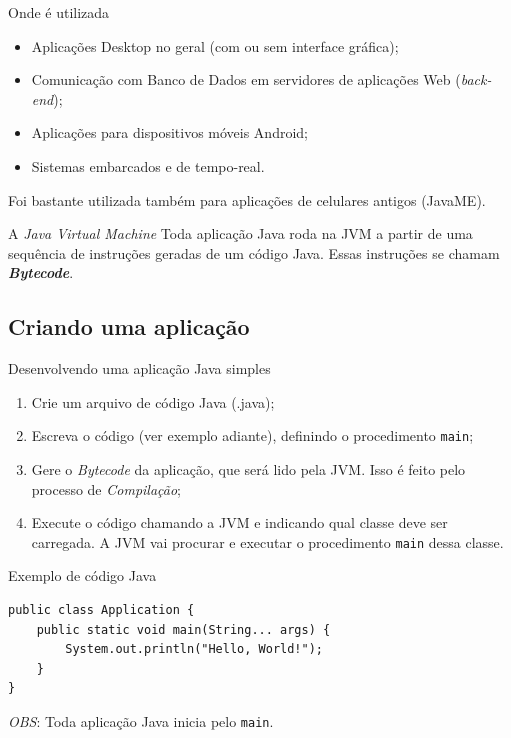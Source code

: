 \documentclass{beamer}
\begin{document}
\begin{frame}{Onde é utilizada}
    \begin{itemize}
        \item Aplicações Desktop no geral (com ou sem interface gráfica);
        \item Comunicação com Banco de Dados em servidores de aplicações Web
            (\textit{back-end});
        \item Aplicações para dispositivos móveis Android;
        \item Sistemas embarcados e de tempo-real.
    \end{itemize}

    Foi bastante utilizada também para aplicações de celulares antigos (JavaME).
\end{frame}


\begin{frame}{A \textit{Java Virtual Machine}}
    Toda aplicação Java roda na JVM a partir de uma sequência de instruções
    geradas de um código Java. Essas instruções se chamam
    \textbf{\textit{Bytecode}}.
\end{frame}


\subsection{Criando uma aplicação}

\begin{frame}{Desenvolvendo uma aplicação Java simples}
    \begin{enumerate}
        \item Crie um arquivo de código Java (.java);
        \item Escreva o código (ver exemplo adiante), definindo o procedimento
            \texttt{main};
        \item Gere o \textit{Bytecode} da aplicação, que será lido pela JVM.
            Isso é feito pelo processo de \emph{Compilação};
        \item Execute o código chamando a JVM e indicando qual classe deve ser
            carregada. A JVM vai procurar e executar o procedimento
            \texttt{main} dessa classe.
    \end{enumerate}
\end{frame}


\begin{frame}[fragile]{Exemplo de código Java}
    \begin{verbatim}
public class Application {
    public static void main(String... args) {
        System.out.println("Hello, World!");
    }
}
    \end{verbatim}

    \emph{OBS}: Toda aplicação Java inicia pelo \texttt{main}.
\end{frame}
\end{document}
